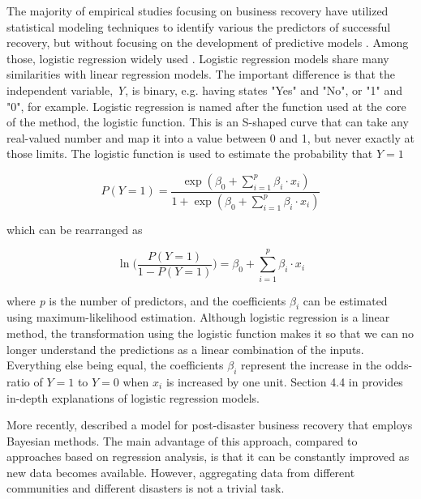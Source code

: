 The majority of empirical studies focusing on business recovery have utilized statistical modeling techniques to identify various the predictors of successful recovery, but without focusing on the development of predictive models \citep{aghababaei2020quantifying}. Among those, logistic regression widely used  \citep{watson2020importance,marshall2015predicting,dahlhamer1998rebounding}. Logistic regression models share many similarities with linear regression models. The important difference is that the independent variable, \textit{Y}, is binary, e.g. having states "Yes" and "No", or "1" and "0", for example. Logistic regression is named after the function used at the core of the method, the logistic function. This is an S-shaped curve that can take any real-valued number and map it into a value between 0 and 1, but never exactly at those limits. The logistic function is used to estimate the probability that $Y=1$

\begin{equation}
    P(Y=1) = \frac{\exp(\beta_0 + \sum_{i=1}^{p}\beta_i \cdot x_i)}{1 + \exp(\beta_0 + \sum_{i=1}^{p}\beta_i \cdot x_i)}
    \label{eq:probability}
\end{equation}

\noindent which can be rearranged as

\begin{equation}
    \ln \Bigg(\frac{P(Y=1)}{1-P(Y=1)}\Bigg) = \beta_0 + \sum_{i=1}^{p}\beta_i \cdot x_i 
    \label{eq:logit}
\end{equation}

\noindent where \textit{p} is the number of predictors, and the coefficients $\beta_i$ can be estimated using maximum-likelihood estimation. Although logistic regression is a linear method, the transformation using the logistic function makes it so that we can no longer understand the predictions as a linear combination of the inputs. Everything else being equal, the coefficients $\beta_i$ represent the increase in the odds-ratio of $Y=1$ to $Y=0$ when $x_i$ is increased by one unit. Section 4.4 in \cite{friedman2001elements} provides in-depth explanations of logistic regression models.\

More recently, \cite{aghababaei2020quantifying} described a model for post-disaster business recovery that employs Bayesian methods. The main advantage of this approach, compared to approaches based on regression analysis, is that it can be constantly improved as new data becomes available. However, aggregating data from different communities and different disasters is not a trivial task.\

